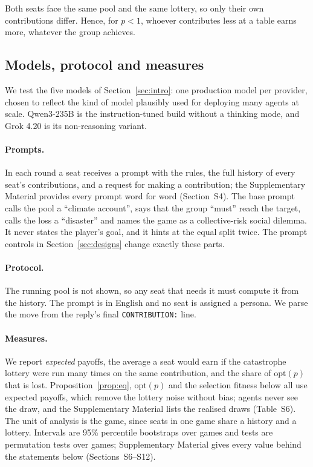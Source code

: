 \documentclass[sigconf,anonymous]{aamas}
\begin{document}
\noindent Both seats face the same pool and the same lottery, so only their own contributions differ. Hence, for $p<1$, whoever contributes  less at a table earns more, whatever the group achieves.

\subsection{Models, protocol and measures}
\label{sec:setup}

We test the five models of Section~\ref{sec:intro}: one production model per provider, chosen to reflect the kind of model plausibly used for deploying many agents at scale. Qwen3-235B is the instruction-tuned build without a thinking mode, and Grok 4.20 is its non-reasoning variant.

\paragraph{Prompts.}
In each round a seat receives a prompt with the rules, the full history of every seat's contributions, and a request for making a contribution; the Supplementary Material provides every prompt word for word (Section~S4). The base prompt calls the pool a ``climate account'', says that the group ``must'' reach the target, calls the loss a ``disaster'' and names the game as a collective-risk social dilemma. It never states the player's goal, and it hints at the equal split twice. The prompt controls in Section~\ref{sec:designs} change exactly these parts.

\paragraph{Protocol.}
The running pool is not shown,  so any seat that needs it must compute it from the history. The prompt is in English and no seat is assigned a persona. We parse the move from the reply's final \texttt{CONTRIBUTION:} line.

\paragraph{Measures.}
We report \emph{expected} payoffs, the average a seat would earn if the catastrophe lottery were run many times on the same contribution, and the share of $\mathrm{opt}(p)$ that is lost. Proposition~\ref{prop:eq}, $\mathrm{opt}(p)$ and the selection fitness below all use expected payoffs, which remove the lottery noise without bias; agents never see the draw, and the Supplementary Material lists the realised draws (Table~S6). The unit of analysis is the game, since seats in one game share a history and a lottery. Intervals are 95\% percentile bootstraps over games and tests are permutation tests over games;  Supplementary Material gives every value behind the statements below (Sections~S6--S12).
\end{document}
